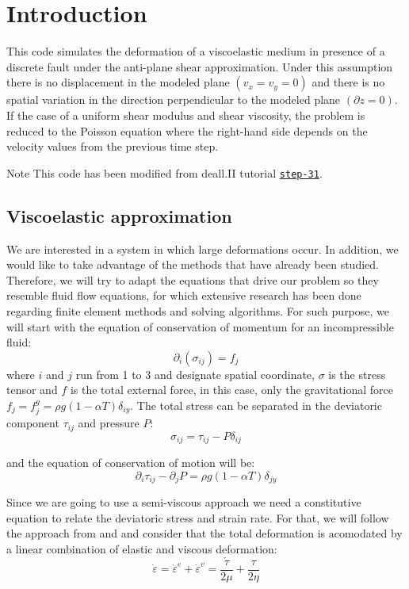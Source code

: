 \hypertarget{index_intro}{}\section{Introduction}\label{index_intro}
This code simulates the deformation of a viscoelastic medium in presence of a discrete fault under the anti-\/plane shear approximation. Under this assumption there is no displacement in the modeled plane $(v_{x}=v_{y}=0)$ and there is no spatial variation in the direction perpendicular to the modeled plane $(\partial z=0)$. If the case of a uniform shear modulus and shear viscosity, the problem is reduced to the Poisson equation where the right-\/hand side depends on the velocity values from the previous time step.

\begin{DoxyNote}{Note}
This code has been modified from deall.\-I\-I tutorial \href{https://www.dealii.org/8.2.0/doxygen/deal.II/step_31.html}{\tt step-\/31}.
\end{DoxyNote}
\hypertarget{index_equations}{}\subsection{Viscoelastic approximation}\label{index_equations}
We are interested in a system in which large deformations occur. In addition, we would like to take advantage of the methods that have already been studied. Therefore, we will try to adapt the equations that drive our problem so they resemble fluid flow equations, for which extensive research has been done regarding finite element methods and solving algorithms. For such purpose, we will start with the equation of conservation of momentum for an incompressible fluid\-: \[\partial_i{(\sigma_{ij})}=f_j\] where $i$ and $j$ run from 1 to 3 and designate spatial coordinate, $\sigma$ is the stress tensor and $f$ is the total external force, in this case, only the gravitational force $f_j=f^g_j=\rho g \left(1-\alpha T \right) \delta_{iy}$. The total stress can be separated in the deviatoric component $\tau_{ij}$ and pressure $P$\-: \[ \sigma_{ij} = \tau_{ij}-P \delta_{ij} \]

and the equation of conservation of motion will be\-: \[\partial_i \tau_{ij} - \partial_j P = \rho g \left( 1 - \alpha T \right) \delta_{jy} \]

Since we are going to use a semi-\/viscous approach we need a constitutive equation to relate the deviatoric stress and strain rate. For that, we will follow the approach from \cite{moresi_et_al_02} and \cite{moresi_et_al_03} and consider that the total deformation is acomodated by a linear combination of elastic and viscous deformation\-: \[ \dot \varepsilon = \dot \varepsilon^e + \dot \varepsilon^v = \frac{\check{\tau}}{2\mu} + \frac{\tau}{2\eta} \]

